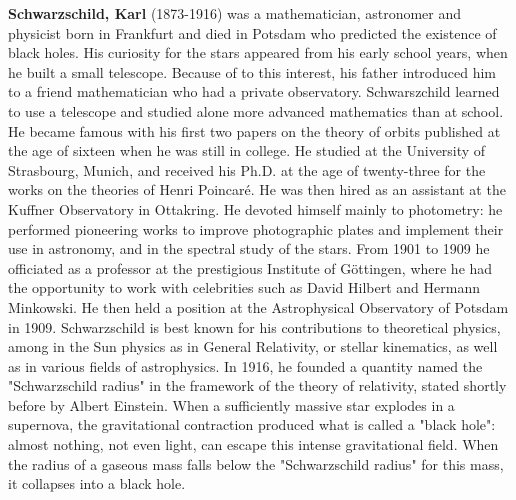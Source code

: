 \textbf{Schwarzschild, Karl} (1873-1916) was a mathematician, astronomer and physicist born in Frankfurt and died in Potsdam who predicted the existence of black holes. His curiosity for the stars appeared from his early school years, when he built a small telescope. Because of to this interest, his father introduced him to a friend mathematician who had a private observatory. Schwarszchild learned to use a telescope and studied alone more advanced mathematics than at school. He became famous with his first two papers on the theory of orbits published at the age of sixteen when he was still in college. He studied at the University of Strasbourg, Munich, and received his Ph.D. at the age of twenty-three for the works on the theories of Henri Poincaré. He was then hired as an assistant at the Kuffner Observatory in Ottakring. He devoted himself mainly to photometry: he performed pioneering works to improve photographic plates and implement their use in astronomy, and in the spectral study of the stars. From 1901 to 1909 he officiated as a professor at the prestigious Institute of Göttingen, where he had the opportunity to work with celebrities such as David Hilbert and Hermann Minkowski. He then held a position at the Astrophysical Observatory of Potsdam in 1909. Schwarzschild is best known for his contributions to theoretical physics, among in the Sun physics as in General Relativity, or stellar kinematics, as well as in various fields of astrophysics. In 1916, he founded a quantity named the "Schwarzschild radius" in the framework of the theory of relativity, stated shortly before by Albert Einstein. When a sufficiently massive star explodes in a supernova, the gravitational contraction produced what is called a "black hole": almost nothing, not even light, can escape this intense gravitational field. When the radius of a gaseous mass falls below the "Schwarzschild radius" for this mass, it collapses into a black hole.

